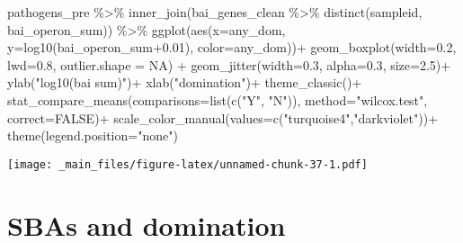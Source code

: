 \documentclass[
]{book}
\newenvironment{Shaded}{\begin{snugshade}}{\end{snugshade}}
\newcommand{\AttributeTok}[1]{\textcolor[rgb]{0.77,0.63,0.00}{#1}}
\newcommand{\ConstantTok}[1]{\textcolor[rgb]{0.00,0.00,0.00}{#1}}
\newcommand{\FloatTok}[1]{\textcolor[rgb]{0.00,0.00,0.81}{#1}}
\newcommand{\FunctionTok}[1]{\textcolor[rgb]{0.00,0.00,0.00}{#1}}
\newcommand{\NormalTok}[1]{#1}
\newcommand{\SpecialCharTok}[1]{\textcolor[rgb]{0.00,0.00,0.00}{#1}}
\newcommand{\StringTok}[1]{\textcolor[rgb]{0.31,0.60,0.02}{#1}}
\begin{document}
\begin{Shaded}
\begin{Highlighting}[]
\NormalTok{pathogens\_pre }\SpecialCharTok{\%\textgreater{}\%} \FunctionTok{inner\_join}\NormalTok{(bai\_genes\_clean }\SpecialCharTok{\%\textgreater{}\%} \FunctionTok{distinct}\NormalTok{(sampleid, bai\_operon\_sum)) }\SpecialCharTok{\%\textgreater{}\%} 
  \FunctionTok{ggplot}\NormalTok{(}\FunctionTok{aes}\NormalTok{(}\AttributeTok{x=}\NormalTok{any\_dom, }\AttributeTok{y=}\FunctionTok{log10}\NormalTok{(bai\_operon\_sum}\FloatTok{+0.01}\NormalTok{),  }\AttributeTok{color=}\NormalTok{any\_dom))}\SpecialCharTok{+}
   \FunctionTok{geom\_boxplot}\NormalTok{(}\AttributeTok{width=}\FloatTok{0.2}\NormalTok{, }\AttributeTok{lwd=}\FloatTok{0.8}\NormalTok{, }\AttributeTok{outlier.shape =} \ConstantTok{NA}\NormalTok{) }\SpecialCharTok{+}
  \FunctionTok{geom\_jitter}\NormalTok{(}\AttributeTok{width=}\FloatTok{0.3}\NormalTok{, }\AttributeTok{alpha=}\FloatTok{0.3}\NormalTok{, }\AttributeTok{size=}\FloatTok{2.5}\NormalTok{)}\SpecialCharTok{+}
  \FunctionTok{ylab}\NormalTok{(}\StringTok{"log10(bai sum)"}\NormalTok{)}\SpecialCharTok{+}
  \FunctionTok{xlab}\NormalTok{(}\StringTok{"domination"}\NormalTok{)}\SpecialCharTok{+}
  \FunctionTok{theme\_classic}\NormalTok{()}\SpecialCharTok{+}
  \FunctionTok{stat\_compare\_means}\NormalTok{(}\AttributeTok{comparisons=}\FunctionTok{list}\NormalTok{(}\FunctionTok{c}\NormalTok{(}\StringTok{"Y"}\NormalTok{, }\StringTok{"N"}\NormalTok{)),}
                     \AttributeTok{method=}\StringTok{"wilcox.test"}\NormalTok{,}
                     \AttributeTok{correct=}\ConstantTok{FALSE}\NormalTok{)}\SpecialCharTok{+}
  \FunctionTok{scale\_color\_manual}\NormalTok{(}\AttributeTok{values=}\FunctionTok{c}\NormalTok{(}\StringTok{"turquoise4"}\NormalTok{,}\StringTok{"darkviolet"}\NormalTok{))}\SpecialCharTok{+}
  \FunctionTok{theme}\NormalTok{(}\AttributeTok{legend.position=}\StringTok{"none"}\NormalTok{)}
\end{Highlighting}
\end{Shaded}

\texttt{[image: \_main\_files/figure-latex/unnamed-chunk-37-1.pdf]}

\hypertarget{sbas-and-domination}{%
\section{SBAs and domination}\label{sbas-and-domination}}
\end{document}
